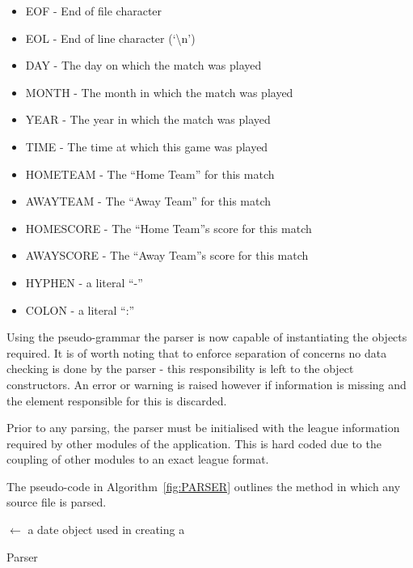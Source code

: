 \begin{itemize}
\item EOF -  End of file character
\item EOL - End of line character (`\textbackslash n')
\item DAY - The day on which the match was played
\item MONTH - The month in which the match was played
\item YEAR - The year in which the match was played
\item TIME - The time at which this game was played
\item HOMETEAM - The ``Home Team'' for this match
\item AWAYTEAM - The ``Away Team'' for this match
\item HOMESCORE - The ``Home Team''s score for this match
\item AWAYSCORE - The ``Away Team''s score for this match
\item HYPHEN - a literal ``-''
\item COLON - a literal ``:''
\end{itemize}

Using the pseudo-grammar the parser is now capable of instantiating
the objects required. It is of worth noting that to enforce separation
of concerns no data checking is done by the parser - this
responsibility is left to the object constructors. An error or warning
is raised however if information is missing and the element
responsible for this is discarded.

Prior to any parsing, the parser must be initialised with the league
information required by other modules of the application. This is hard
coded due to the coupling of other modules to an exact league format.

The pseudo-code in Algorithm~\ref{fig:PARSER} outlines the method in
which any source file is parsed.

\IncMargin{2em}
\begin{algorithm}
  \SetAlgoLined
   
   
   

  \Date $\leftarrow$ a date object used in creating a \Match\;
    \caption{Parser}\label{fig:PARSER}
\end{algorithm}
\DecMargin{2em}


\clearpage

